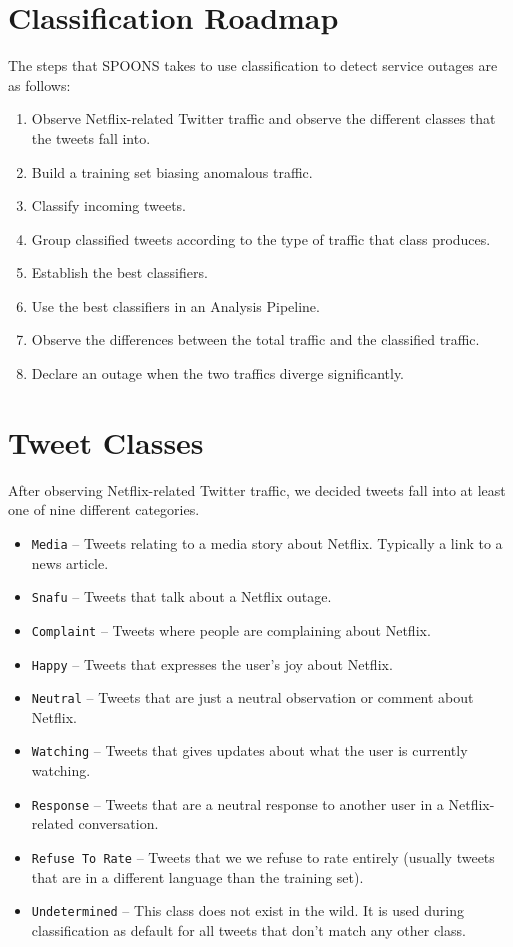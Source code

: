 \documentclass[12pt]{ucthesis}
\begin{document}
\section{Classification Roadmap}
\label{class-roadmap}
The steps that SPOONS takes to use classification to detect service outages are as follows:

\begin{enumerate}
   \item Observe Netflix-related Twitter traffic and observe the different classes that the tweets fall into.
   \item Build a training set biasing anomalous traffic.
   \item Classify incoming tweets.
   \item Group classified tweets according to the type of traffic that class produces.
   \item Establish the best classifiers.
   \item Use the best classifiers in an Analysis Pipeline.
   \item Observe the differences between the total traffic and the classified traffic.
   \item Declare an outage when the two traffics diverge significantly.
\end{enumerate}

\section{Tweet Classes}
\label{class-tweet-classes}
After observing Netflix-related Twitter traffic, we decided tweets fall into at least one of nine different categories.

\begin{itemize}
  \item \texttt{Media} -- Tweets relating to a media story about Netflix. Typically a link to a news article.
  \item \texttt{Snafu} -- Tweets that talk about a Netflix outage.
  \item \texttt{Complaint} -- Tweets where people are complaining about Netflix.
  \item \texttt{Happy} -- Tweets that expresses the user's joy about Netflix.
  \item \texttt{Neutral} -- Tweets that are just a neutral observation or comment about Netflix.
  \item \texttt{Watching} -- Tweets that gives updates about what the user is currently watching.
  \item \texttt{Response} -- Tweets that are a neutral response to another user in a Netflix-related conversation.
  \item \texttt{Refuse To Rate} -- Tweets that we we refuse to rate entirely (usually tweets that are in a different language than the training set).
  \item \texttt{Undetermined} -- This class does not exist in the wild. It is used during classification as default for all tweets that don't match any other class.
\end{itemize}
\end{document}
